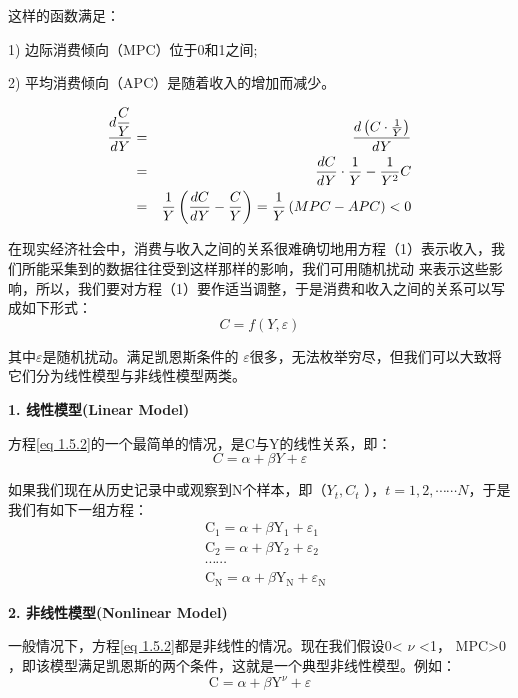 这样的函数满足：

1) \quad 边际消费倾向（MPC）位于0和1之间; 

2) \quad 平均消费倾向（APC）是随着收入的增加而减少。

\begin{eqnarray}
\frac{d \dfrac{C}{Y}}{d Y} & = & \frac{d\left(C \cdot \frac{1}{Y}\right)}{d Y} \notag \\ 
& = & \frac{d C}{d Y} \cdot \frac{1}{Y}-\frac{1}{Y^{2}} C \notag \\ 
& = & \frac{1}{Y}\left( \frac{d C}{d Y} -\frac{C}{Y}\right) \notag =\frac{1}{Y}\left( MPC -APC\right)<0
\end{eqnarray}

在现实经济社会中，消费与收入之间的关系很难确切地用方程（1）表示收入，我们所能采集到的数据往往受到这样那样的影响，我们可用随机扰动 来表示这些影响，所以，我们要对方程（1）要作适当调整，于是消费和收入之间的关系可以写成如下形式：
\begin{equation}
	C = f(Y,\varepsilon)
	\label{eq 1.5.2}
\end{equation}

其中$\varepsilon$是随机扰动。满足凯恩斯条件的 $\varepsilon$很多，无法枚举穷尽，但我们可以大致将它们分为线性模型与非线性模型两类。

\textbf{1. \quad 线性模型(Linear Model)}

方程\eqref{eq 1.5.2}的一个最简单的情况，是C与Y的线性关系，即：
\begin{equation}
	C = \alpha + \beta Y + \varepsilon
\end{equation}

如果我们现在从历史记录中或观察到N个样本，即（$Y_t , C_t $ ），$ t=1,2,\cdots \cdots N $，于是我们有如下一组方程：
\begin{align*}
	&\mathrm{C}_{1}=\alpha+\beta \mathrm{Y}_{1}+\varepsilon_{1}\\
	&\mathrm{C}_{2}=\alpha+\beta \mathrm{Y}_{2}+\varepsilon_{2}\\
	&\cdots\cdots \\
	&\mathrm{C}_{\mathrm{N}}=\alpha+\beta \mathrm{Y}_{\mathrm{N}}+\varepsilon_{\mathrm{N}} 
\end{align*}

\textbf{2. \quad 非线性模型(Nonlinear Model)}

一般情况下，方程\eqref{eq 1.5.2}都是非线性的情况。现在我们假设0< $ \nu $ <1， MPC>0 ，即该模型满足凯恩斯的两个条件，这就是一个典型非线性模型。例如：
\begin{equation*}
	\mathrm{C}=\alpha+\beta \mathrm{Y}^{\nu}+\varepsilon
\end{equation*}
